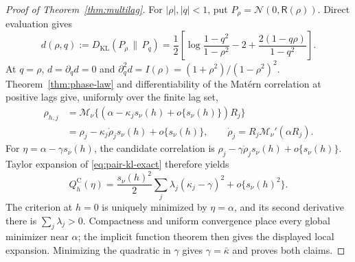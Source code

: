 \documentclass[sigconf]{acmart}
\theoremstyle{remark}
\newcommand{\Matern}{\mathcal M}
\newcommand{\KL}{D_{\mathrm{KL}}}
\newcommand{\Normal}{\mathcal N}
\begin{document}
\begin{proof}[Proof of Theorem~\ref{thm:multilag}]
For \(|\rho|,|q|<1\), put
\(P_\rho=\Normal(0,\mathsf R(\rho))\). Direct evaluation gives
\begin{equation}
 d(\rho,q):=\KL(P_\rho\,\|\,P_q)
 =\frac12\left[
 \log\frac{1-q^2}{1-\rho^2}-2+
 \frac{2(1-q\rho)}{1-q^2}\right].
 \label{eq:pair-kl-exact}
\end{equation}
At \(q=\rho\), \(d=\partial_qd=0\) and
\(\partial_q^2d=I(\rho)=(1+\rho^2)/(1-\rho^2)^2\).
Theorem~\ref{thm:phase-law} and differentiability of the Matérn correlation
at positive lags give, uniformly over the finite lag set,
\begin{align*}
 \rho_{h,j}
 &=\Matern_\nu\{(\alpha-\kappa_j s_\nu(h)+o\{s_\nu(h)\})R_j\}\\
 &=\rho_j-\kappa_j\dot\rho_j s_\nu(h)+o\{s_\nu(h)\},
 \qquad \dot\rho_j=R_j\Matern_\nu'(\alpha R_j).
\end{align*}
For \(\eta=\alpha-\gamma s_\nu(h)\), the candidate correlation is
\(\rho_j-\gamma\dot\rho_j s_\nu(h)+o\{s_\nu(h)\}\). Taylor expansion of
\eqref{eq:pair-kl-exact} therefore yields
\[
 Q_h^{\mathrm C}(\eta)=\frac{s_\nu(h)^2}{2}
 \sum_j\lambda_j(\kappa_j-\gamma)^2+o\{s_\nu(h)^2\}.
\]
The criterion at \(h=0\) is uniquely minimized by \(\eta=\alpha\), and its
second derivative there is \(\sum_j\lambda_j>0\). Compactness and uniform
convergence place every global minimizer near \(\alpha\); the implicit function
theorem then gives the displayed local expansion. Minimizing the quadratic in
\(\gamma\) gives \(\gamma=\bar\kappa\) and proves both claims.
\end{proof}
\end{document}
